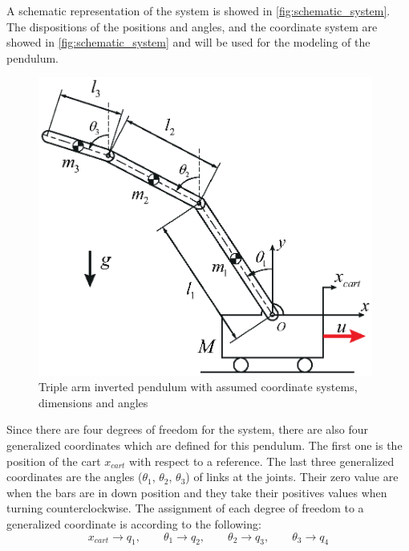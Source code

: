 \documentclass[a4paper,12pt,twoside]{article}
\begin{document}
A schematic representation of the system is showed in \autoref{fig:schematic_system}. The dispositions of the positions and angles, and the coordinate system are showed in \autoref{fig:schematic_system} and will be used for the modeling of the pendulum.
\begin{figure}[ht]
	\centering
	\includegraphics[width=11cm]{illustrations/schematic_system.eps}
	\caption{Triple arm inverted pendulum with assumed coordinate systems, dimensions and angles}
	\label{fig:schematic_system}
\end{figure}

Since there are four degrees of freedom for the system, there are also four generalized coordinates which are defined for this pendulum. The first one is the position of the cart $x_{cart}$ with respect to a reference. The last three generalized coordinates are the angles ($\theta_1$, $\theta_2$, $\theta_3$) of links at the joints. Their zero value are when the bars are in down position and they take their positives values when turning counterclockwise. The assignment of each degree of freedom to a generalized coordinate is according to the following:
\[
	x_{cart}\to q_1, \qquad \theta_1\to q_2, \qquad \theta_2\to q_3, \qquad \theta_3\to q_4
\]
\end{document}
